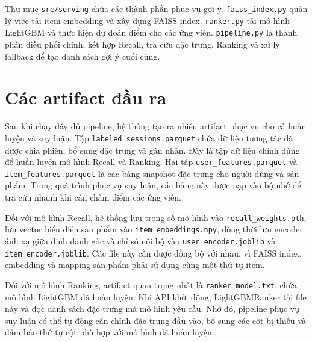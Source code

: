 Thư mục \texttt{src/serving} chứa các thành phần phục vụ gợi ý. \texttt{faiss\_index.py} quản lý việc tải item embedding và xây dựng FAISS index. \texttt{ranker.py} tải mô hình LightGBM và thực hiện dự đoán điểm cho các ứng viên. \texttt{pipeline.py} là thành phần điều phối chính, kết hợp Recall, tra cứu đặc trưng, Ranking và xử lý fallback để tạo danh sách gợi ý cuối cùng.

\section{Các artifact đầu ra}
Sau khi chạy đầy đủ pipeline, hệ thống tạo ra nhiều artifact phục vụ cho cả huấn luyện và suy luận. Tập \texttt{labeled\_sessions.parquet} chứa dữ liệu tương tác đã được chia phiên, bổ sung đặc trưng và gán nhãn. Đây là tập dữ liệu chính dùng để huấn luyện mô hình Recall và Ranking. Hai tập \texttt{user\_features.parquet} và \texttt{item\_features.parquet} là các bảng snapshot đặc trưng cho người dùng và sản phẩm. Trong quá trình phục vụ suy luận, các bảng này được nạp vào bộ nhớ để tra cứu nhanh khi cần chấm điểm các ứng viên.
\medskip

Đối với mô hình Recall, hệ thống lưu trọng số mô hình vào \texttt{recall\_weights.pth}, lưu vector biểu diễn sản phẩm vào \texttt{item\_embeddings.npy}, đồng thời lưu encoder ánh xạ giữa định danh gốc và chỉ số nội bộ vào \texttt{user\_encoder.joblib} và \texttt{item\_encoder.joblib}. Các file này cần được đồng bộ với nhau, vì FAISS index, embedding và mapping sản phẩm phải sử dụng cùng một thứ tự item.
\medskip

Đối với mô hình Ranking, artifact quan trọng nhất là \texttt{ranker\_model.txt}, chứa mô hình LightGBM đã huấn luyện. Khi API khởi động, LightGBMRanker tải file này và đọc danh sách đặc trưng mà mô hình yêu cầu. Nhờ đó, pipeline phục vụ suy luận có thể tự động căn chỉnh đặc trưng đầu vào, bổ sung các cột bị thiếu và đảm bảo thứ tự cột phù hợp với mô hình đã huấn luyện.
